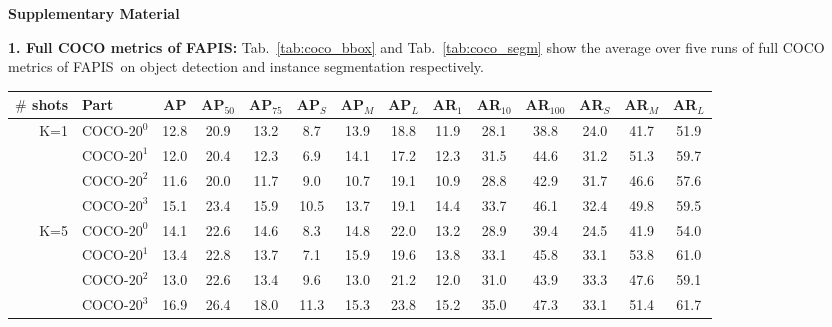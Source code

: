 \documentclass[final]{cvpr}
\def\Approach{FAPIS}
\begin{document}
{\small


}


\onecolumn

\begin{center}
   \Large \textbf{Supplementary Material}
\end{center}


\textbf{1. Full COCO metrics of \Approach:}
Tab.~\ref{tab:coco_bbox} and Tab.~\ref{tab:coco_segm} show the average over five runs of full COCO metrics of \Approach~on object detection and instance segmentation respectively.

\begin{table*}[h]
\begin{center}
\small
\setlength{\tabcolsep}{5pt}
\begin{tabular}{ r  |l|ccc|ccc|ccc|ccc}
\hline 
\hline
\textbf{$\#$ shots} & \textbf{Part} & \textbf{AP} & \textbf{AP$_{50}$} & \textbf{AP$_{75}$} & \textbf{AP$_S$} & \textbf{AP$_M$} & \textbf{AP$_L$} & \textbf{AR$_{1}$} & \textbf{AR$_{10}$} & \textbf{AR$_{100}$} & \textbf{AR$_{S}$} & \textbf{AR$_{M}$} & \textbf{AR$_{L}$} \\
 \hline
\multirow{4}{*}{K=1}  
&  COCO-$20^0$     & 12.8 & 20.9 & 13.2 & 8.7 & 13.9 & 18.8 & 11.9 & 28.1 & 38.8 & 24.0 & 41.7 & 51.9 \\
&  COCO-$20^1$     & 12.0 & 20.4 & 12.3 & 6.9 & 14.1 & 17.2 & 12.3 & 31.5 & 44.6 & 31.2 & 51.3 & 59.7 \\
&  COCO-$20^2$     & 11.6 & 20.0 & 11.7 & 9.0 & 10.7 & 19.1 & 10.9 & 28.8 & 42.9 & 31.7 & 46.6 & 57.6 \\
&  COCO-$20^3$     & 15.1 & 23.4 & 15.9 & 10.5 & 13.7 & 19.1 & 14.4 & 33.7 & 46.1 & 32.4 & 49.8 & 59.5 \\
\hline
\multirow{4}{*}{K=5}  
&  COCO-$20^0$     & 14.1 & 22.6 & 14.6 & 8.3 & 14.8 & 22.0 & 13.2 & 28.9 & 39.4 & 24.5 & 41.9 & 54.0 \\
&  COCO-$20^1$     & 13.4 & 22.8 & 13.7 & 7.1 & 15.9 & 19.6 & 13.8 & 33.1 & 45.8 & 33.1 & 53.8 & 61.0 \\
&  COCO-$20^2$     & 13.0 & 22.6 & 13.4 & 9.6 & 13.0 & 21.2 & 12.0 & 31.0 & 43.9 & 33.3 & 47.6 & 59.1 \\
&  COCO-$20^3$     & 16.9 & 26.4 & 18.0 & 11.3 & 15.3 & 23.8 & 15.2 & 35.0 & 47.3 & 33.1 & 51.4 & 61.7 \\
\hline
\hline
\end{tabular}
\end{center}
\vspace{-5pt}
\caption{Object detection results of \Approach~on full COCO metrics}
\label{tab:coco_bbox}
\end{table*}
\end{document}
